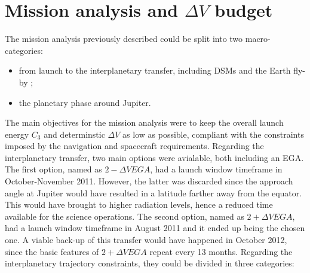 \section{Mission analysis and \texorpdfstring{$\Delta V$}{Delta-V} budget}
\label{sec:ma_and_dv}
The mission analysis previously described could be split into two macro-categories:
\begin{itemize}
    \item from launch to the interplanetary transfer, including DSMs and the Earth fly-by ;
    \item the planetary phase around Jupiter.
\end{itemize}
The main objectives for the mission analysis were to keep the overall launch energy $C_3$ and determinstic $\Delta V$ as low as possible, compliant with the constraints imposed by the navigation and spacecraft requirements. Regarding the interplanetary transfer, two main options were avialable, both including an EGA. The first option, named as $2-\Delta V EGA$, had a launch window timeframe in October-November 2011. However, the latter was discarded since the approach angle at Jupiter would have resulted in a latitude farther away from the equator. This would have brought to higher radiation levels, hence a reduced time available for the science operations. The second option, named as $2+\Delta V EGA$, had a launch window timeframe in August 2011 and it ended up being the chosen one. A viable back-up of this transfer would have happened in October 2012, since the basic features of $2+\Delta V EGA$ repeat every 13 months.
Regarding the interplanetary trajectory constraints, they could be divided in three categories:

